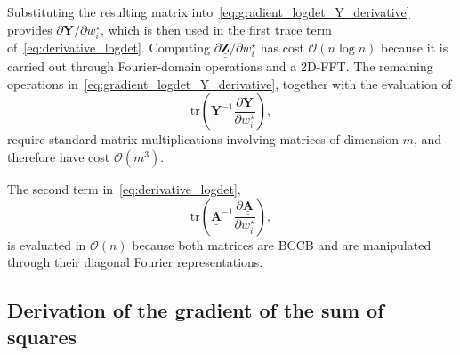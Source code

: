 \documentclass[12pt]{article}
\newcommand{\mybcirc}[1] {\underline{\underline{\bm{#1}}}}
\begin{document}
Substituting the resulting matrix into~\eqref{eq:gradient_logdet_Y_derivative} provides
$\partial \bm{Y}/\partial w_i^\star$,
which is then used in the first trace term of~\eqref{eq:derivative_logdet}. Computing
$\partial \mybcirc{Z}/\partial w_i^\star$
has cost
$\mathcal{O}(n\log n)$
because it is carried out through Fourier-domain operations and a 2D-FFT. The remaining operations in~\eqref{eq:gradient_logdet_Y_derivative}, together with the evaluation of
\begin{equation}
    \mathrm{tr}
    \!\left(
        \bm{Y}^{-1}
        \frac{\partial \bm{Y}}
        {\partial w_i^\star}
    \right),
\end{equation}
require standard matrix multiplications involving matrices of dimension $m$, and therefore have cost
$\mathcal{O}(m^3)$.

The second term in~\eqref{eq:derivative_logdet},
\begin{equation}
    \mathrm{tr}
    \!\left(
        \mybcirc{A}^{-1}
        \frac{\partial \mybcirc{A}}
        {\partial w_i^\star}
    \right),
\end{equation}
is evaluated in $\mathcal{O}(n)$ because both matrices are BCCB and are manipulated through their diagonal Fourier representations.
\subsection{Derivation of the gradient of the sum of squares}\label{ap:gradient_ss}
\end{document}
